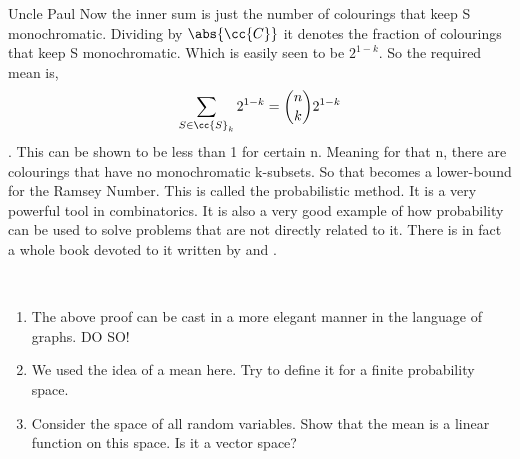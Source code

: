 \documentclass{myclass}
\begin{document}
\begin{yellowbox}{Uncle Paul}
    Now the inner sum is just the number of colourings that keep S monochromatic. Dividing by $\abs{\cc{C}}$ it denotes the fraction of colourings that keep S monochromatic. Which is easily seen to be $2^{1-k}$. 
    So the required mean is,$$\sum_{S\in \cc{S}_k}2^{1-k}=\binom{n}{k} 2^{1-k}$$. This can be shown to be less than 1 for certain n. Meaning for that n, there are colourings that have no monochromatic k-subsets.
    So that becomes a lower-bound for the Ramsey Number. This is called the probabilistic method. It is a very powerful tool in combinatorics. It is also a very good example of how probability can be used to solve problems that are not directly related to it.
    There is in fact a whole book devoted to it written by  and . 
    
\end{yellowbox}

\begin{exes}
    \hspace{1cm}\\
    \begin{enumerate}\item The above proof can be cast in a more elegant manner in the language of graphs. DO SO!
        \item We used the idea of a mean here. Try to define it for a finite probability space.
        \item Consider the space of all random variables. Show that the mean is a linear function on this space. Is it a vector space?
    \end{enumerate}
\end{exes}
\end{document}
